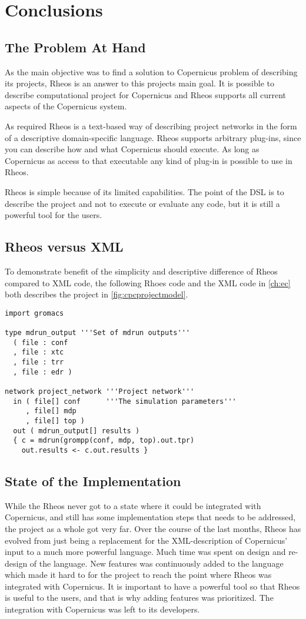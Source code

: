 \chapter{Conclusions}

\section{The Problem At Hand}
As the main objective was to find a solution to Copernicus problem of
describing its projects, Rheos is an answer to this projects main
goal. It is possible to describe computational project for Copernicus
and Rheos supports all current aspects of the Copernicus system.

As required Rheos is a text-based way of describing project networks
in the form of a descriptive domain-specific language. Rheos supports
arbitrary plug-ins, since you can describe how and what Copernicus
should execute. As long as Copernicus as access to that executable any
kind of plug-in is possible to use in Rheos.

Rheos is simple because of its limited capabilities. The point of the
DSL is to describe the project and not to execute or evaluate any
code, but it is still a powerful tool for the users.

\section{Rheos versus XML}
To demonstrate benefit of the simplicity and descriptive difference of
Rheos compared to XML code, the following Rhoes code and the XML code
in \autoref{ch:ec} both describes the project in
\autoref{fig:cpcprojectmodel}.

\begin{verbatim}
import gromacs

type mdrun_output '''Set of mdrun outputs'''
  ( file : conf
  , file : xtc
  , file : trr
  , file : edr )

network project_network '''Project network'''
  in ( file[] conf      '''The simulation parameters'''
     , file[] mdp
     , file[] top )
  out ( mdrun_output[] results )
  { c = mdrun(grompp(conf, mdp, top).out.tpr)
    out.results <- c.out.results }
\end{verbatim}

\section{State of the Implementation}
While the Rheos never got to a state where it could be integrated with
Copernicus, and still has some implementation steps that needs to be
addressed, the project as a whole got very far. Over the course of the
last months, Rheos has evolved from just being a replacement for the
XML-description of Copernicus' input to a much more powerful
language. Much time was spent on design and re-design of the
language. New features was continuously added to the language which
made it hard to for the project to reach the point where Rheos was
integrated with Copernicus. It is important to have a powerful tool so
that Rheos is useful to the users, and that is why adding features was
prioritized. The integration with Copernicus was left to its
developers.

